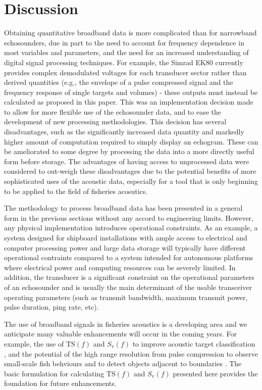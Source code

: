 \documentclass[preprint,12pt,TurnOnLineNumbers]{JASAnew}
\newcommand{\ek}{Simrad EK80}
\newcommand{\freqsym}{f}
\newcommand{\ts}{\textrm{TS}}
\newcommand{\sv}{S_{\textrm{v}}}
\begin{document}
\section{Discussion}
Obtaining quantitative broadband data is more complicated than for narrowband echosounders, due in part to the need to account for frequency dependence in most variables and parameters, and the need for an increased understanding of digital signal processing techniques. For example, the \ek{} currently provides complex demodulated \citep{hasan1983} voltages for each transducer sector rather than derived quantities (e.g., the envelope of a pulse compressed signal and the frequency response of single targets and volumes) - these outputs must instead be calculated as proposed in this paper. This was an implementation decision made to allow for more flexible use of the echosounder data, and to ease the development of new processing methodologies. This decision has several disadvantages, such as the significantly increased data quantity and markedly higher amount of computation required to simply display an echogram. These can be ameliorated to some degree by processing the data into a more directly useful form before storage. The advantages of having access to unprocessed data were considered to out-weigh these disadvantages due to the potential benefits of more sophisticated uses of the acoustic data, especially for a tool that is only beginning to be applied to the field of fisheries acosutics.

The methodology to process broadband data has been presented in a general form in the previous sections without any accord to engineering limits. However, any physical implementation introduces operational constraints. As an example, a system designed for shipboard installations with ample access to electrical and computer processing power and large data storage will typically have different operational contraints compared to a system intended for autonomous platforms where electrical power and computing resources can be severely limited. In addition, the transducer is a significant constraint on the operational parameters of an echosounder and is usually the main determinant of the usable transceiver operating parameters (such as transmit bandwidth, maximum transmit power, pulse duration, ping rate, etc).

The use of broadband signals in fisheries acoustics is a developing area and we anticipate many valuable enhancements will occur in the coming years. For example, the use of $\ts(\freqsym)$ and $\sv(\freqsym)$ to improve acoustic target classification \citep{bassettBroadbandEchosounderMeasurements2018, korneliussen2018}, and the potential of the high range resolution from pulse compression to observe small-scale fish behviours \citep{skaret2020} and to detect objects adjacent to boundaries \citep{lavery2017}. The basic formulation for calculating $\ts(\freqsym)$ and $\sv(\freqsym)$ presented here provides the foundation for future enhancements.
\end{document}

